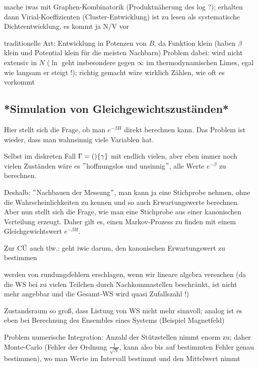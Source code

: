 mache iwas mit Graphen-Kombinatorik (Produktnäherung des log ?); erhalten dann Virial-Koeffizienten (Cluster-Entwicklung)
ist zu lesen als systematische Dichteentwicklung, es kommt ja N/V vor


traditionelle Art: Entwicklung in Potenzen von $B$, da Funktion klein (haben $\beta$ klein und Potential klein für die meisten Nachbarn)
Problem dabei: wird nicht extensiv in $N$ ($\ln$ geht insbesondere gegen $\infty$ im thermodynamischen Limes, egal wie langsam er steigt !); richtig gemacht wäre wirklich Zählen, wie oft es vorkommt



	\subsection{*Simulation von Gleichgewichtszuständen*}
Hier stellt sich die Frage, ob man $e^{-\beta H}$ direkt berechnen kann. Das Problem ist wieder, dass man wahnsinnig viele Variablen hat.

Selbst im diskreten Fall $\Gamma = \qty\{\gamma\}$ mit endlich vielen, aber eben immer noch vielen Zuständen wäre es $"$hoffnungslos und unsinnig$"$, alle Werte $e^{-\beta}$ zu berechnen.

Deshalb: $"$Nachbauen der Messung$"$, man kann ja eine Stichprobe nehmen, ohne die Wahrscheinlichkeiten zu kennen und so auch Erwartungswerte berechnen. Aber nun stellt sich die Frage, wie man eine Stichprobe aus einer kanonischen Verteilung erzeugt. Daher gilt es, einen Markov-Prozess zu finden mit einem Gleichgewichtswert $e^{-\beta H}$.


Zur CÜ auch tlw.:
geht iwie darum, den kanonischen Erwartungswert zu bestimmen

werden von rundungsfehlern erschlagen, wenn wir lineare algebra versuchen (da die WS bei zu vielen Teilchen durch Nachkommastellen beschränkt, ist nicht mehr angebbar und die Gesamt-WS wird quasi Zufallszahl !)

Zustandsraum so groß, dass Listung von WS nicht mehr sinnvoll; analog ist es eben bei Berechnung des Ensembles eines Systems (Beispiel Magnetfeld)


Problem numerische Integration: Anzahl der Stützstellen nimmt enorm zu; daher Monte-Carlo (Fehler der Ordnung $\frac{1}{\sqrt{N}}$, kann also bis auf bestimmten Fehler genau bestimmen), wo man Werte im Intervall bestimmt und den Mittelwert nimmt


